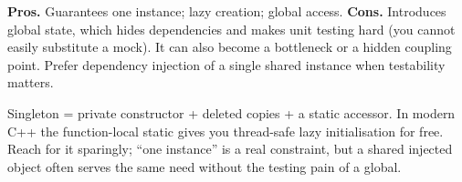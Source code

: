 \begin{complexitybox}
\textbf{Pros.} Guarantees one instance; lazy creation; global access.
\textbf{Cons.} Introduces global state, which hides dependencies and makes
unit testing hard (you cannot easily substitute a mock). It can also
become a bottleneck or a hidden coupling point. Prefer dependency
injection of a single shared instance when testability matters.
\end{complexitybox}

\begin{takeawaybox}
Singleton = private constructor + deleted copies + a static accessor.
In modern C++ the function-local static gives you thread-safe lazy
initialisation for free. Reach for it sparingly; ``one instance'' is a
real constraint, but a shared injected object often serves the same need
without the testing pain of a global.
\end{takeawaybox}
